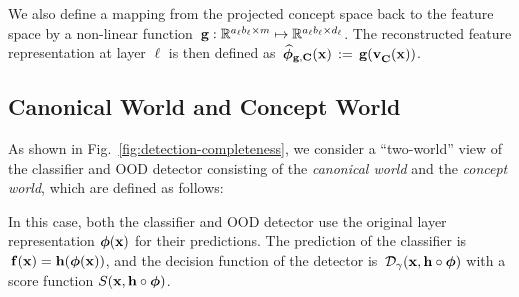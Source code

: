 We also define a mapping from the projected concept space back to the feature space by a non-linear function $\,\mathbf{g} : \mathbb{R}^{a_\ell b_\ell \times m} \mapsto \mathbb{R}^{a_\ell b_\ell \times d_\ell}$.
The reconstructed feature representation at layer $\ell$ is then defined as $\,\widehat{\bm{\phi}}_{\mathbf{g}, \mathbf{C}}(\mathbf{x}) \,:=\, \mathbf{g}(\mathbf{v}^{}_{\mathbf{C}}(\mathbf{x}))$.


\subsection{Canonical World and Concept World}
\label{sec:two_worlds}
As shown in Fig.~\ref{fig:detection-completeness}, we consider a ``two-world'' view of the classifier and OOD detector consisting of the {\em canonical world} and the {\em concept world}, which are defined as follows:

In this case, both the classifier and OOD detector use the original layer representation $\bm{\phi}(\mathbf{x})$ for their predictions. The prediction of the classifier is $\,\mathbf{f}(\mathbf{x}) = \mathbf{h}(\bm{\phi}(\mathbf{x}))$, and the decision function of the detector is $\,\mathcal{D}_\gamma(\mathbf{x}, \mathbf{h} \circ \bm{\phi})$ with a score function $S(\mathbf{x}, \mathbf{h} \circ \bm{\phi})$.

